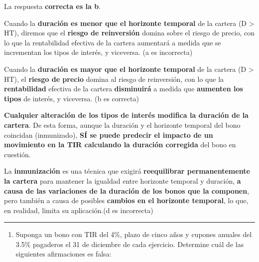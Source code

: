 \documentclass[
  letterpaper,
  DIV=11,
  numbers=noendperiod]{scrreprt}
\providecommand{\tightlist}{%
  \setlength{\itemsep}{0pt}\setlength{\parskip}{0pt}}\usepackage{longtable,booktabs,array}
\begin{document}
\begin{tcolorbox}
\begin{tcolorbox}[enhanced jigsaw, toprule=.15mm, left=2mm, arc=.35mm, breakable, bottomrule=.15mm, opacityback=0, rightrule=.15mm, leftrule=.75mm, colframe=quarto-callout-note-color-frame, colback=white]
\begin{minipage}[t]{5.5mm}
\textcolor{quarto-callout-note-color}{\faInfo}
\end{minipage}%
\begin{minipage}[t]{\textwidth - 5.5mm}

La respuesta \textbf{correcta es la b}.

Cuando la \textbf{duración es menor que el horizonte temporal} de la
cartera (D \textgreater{} HT), diremos que el \textbf{riesgo de
reinversión} domina sobre el riesgo de precio, con lo que la
rentabilidad efectiva de la cartera aumentará a medida que se
incrementan los tipos de interés, y viceversa. (a es incorrecta)

Cuando la \textbf{duración es mayor que el horizonte temporal} de la
cartera (D \textgreater{} HT), el \textbf{riesgo de precio} domina al
riesgo de reinversión, con lo que la \textbf{rentabilidad} efectiva de
la cartera \textbf{disminuirá} a medida que \textbf{aumenten los tipos}
de interés, y viceversa. (b es correcta)

\textbf{Cualquier alteración de los tipos de interés modifica la
duración de la cartera}. De esta forma, aunque la duración y el
horizonte temporal del bono coincidan (inmunizado), \textbf{SÍ se puede
predecir el impacto de un movimiento en la TIR calculando la duración
corregida} del bono en cuestión.

La \textbf{inmunización} es una técnica que exigirá \textbf{reequilibrar
permanentemente la cartera} para mantener la igualdad entre horizonte
temporal y duración, \textbf{a causa de las variaciones de la duración
de los bonos que la componen}, pero también a causa de posibles
\textbf{cambios en el horizonte temporal}, lo que, en realidad, limita
su aplicación.(d es incorrecta)

\end{minipage}%
\end{tcolorbox}

\begin{center}\rule{0.5\linewidth}{0.5pt}\end{center}

\begin{enumerate}
\def\labelenumi{\arabic{enumi}.}
\setcounter{enumi}{4}
\tightlist
\item
  Suponga un bono con TIR del 4\%, plazo de cinco años y cupones anuales
  del 3.5\% pagaderos el 31 de diciembre de cada ejercicio. Determine
  cuál de las siguientes afirmaciones es falsa:
\end{enumerate}


\end{tcolorbox}
\end{document}
